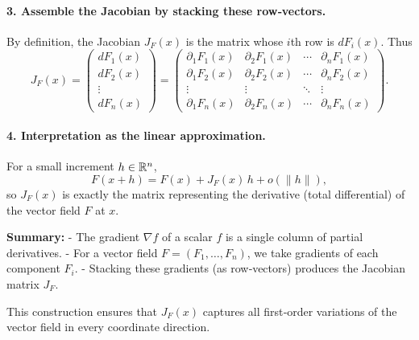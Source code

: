 \documentclass[11pt,openany]{article}
\renewcommand{\emph}[1]{\textbf{#1}}
\begin{document}
\bigskip

\paragraph{3. Assemble the Jacobian by stacking these row‐vectors.}  
By definition, the Jacobian \(J_F(x)\) is the matrix whose \(i\)th row is \(dF_i(x)\).  Thus
\[
J_F(x)
=\begin{pmatrix}
	dF_1(x)\\[6pt]
	dF_2(x)\\[6pt]
	\vdots\\[4pt]
	dF_n(x)
\end{pmatrix}
=
\begin{pmatrix}
	\partial_1F_1(x) & \partial_2F_1(x) & \cdots & \partial_nF_1(x)\\[8pt]
	\partial_1F_2(x) & \partial_2F_2(x) & \cdots & \partial_nF_2(x)\\[8pt]
	\vdots           & \vdots           & \ddots & \vdots\\[4pt]
	\partial_1F_n(x) & \partial_2F_n(x) & \cdots & \partial_nF_n(x)
\end{pmatrix}.
\]

\bigskip

\paragraph{4. Interpretation as the linear approximation.}  
For a small increment \(h\in\mathbb{R}^n\),
\[
F(x+h)
=F(x) + J_F(x)\,h + o(\|h\|),
\]
so \(J_F(x)\) is exactly the matrix representing the derivative (total differential) of the vector field \(F\) at \(x\).

\bigskip

\noindent\emph{Summary:}  
- The gradient \(\nabla f\) of a scalar \(f\) is a single column of partial derivatives.  
- For a vector field \(F=(F_1,\dots,F_n)\), we take gradients of each component \(F_i\).  
- Stacking these gradients (as row‐vectors) produces the Jacobian matrix \(J_F\).  

This construction ensures that \(J_F(x)\) captures all first‐order variations of the vector field in every coordinate direction.
\end{document}
